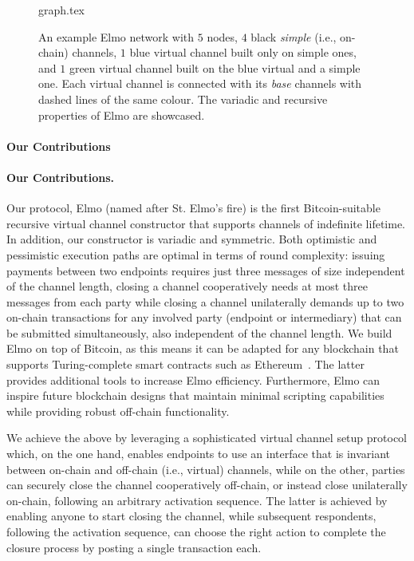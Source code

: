 \begin{figure}[!htbp]
  \centering
  {graph.tex}
  \caption{An example Elmo network with $5$ nodes, $4$ black \emph{simple}
  (i.e., on-chain) channels, $1$ blue virtual channel built only on simple ones,
  and $1$ green virtual channel built on the blue virtual and a simple one. Each
  virtual channel is connected with its \emph{base} channels with dashed lines
  of the same colour. The variadic and recursive properties of Elmo are
  showcased.}
  \label{figure:graph}
\end{figure}

\makeatletter%
%
  {\paragraph{Our Contributions}}%
  {\paragraph{Our Contributions.}}%
\makeatother%
 Our protocol, Elmo (named after St.
Elmo's fire) is the first Bitcoin-suitable
recursive virtual channel constructor that supports channels
of indefinite lifetime. In addition, our constructor is variadic and symmetric. Both optimistic and
pessimistic execution paths are optimal in terms of round complexity: issuing
payments between two endpoints requires just three messages of size
independent of the channel length, closing a channel cooperatively
needs at most three messages from each party while
closing a channel unilaterally demands up to two on-chain transactions for
any involved party (endpoint or intermediary) that can be submitted
simultaneously, also independent of the channel length. We build Elmo on top
of Bitcoin, as this means it can be adapted for any blockchain that
supports Turing-complete smart contracts such as
Ethereum~\cite{wood2014ethereum}. The latter provides additional tools to
increase Elmo efficiency. Furthermore, Elmo can inspire future
blockchain designs that maintain minimal scripting capabilities while
providing robust off-chain functionality.

We achieve the above by leveraging a sophisticated virtual channel setup
protocol which, on the one hand, enables endpoints to use an interface that is
invariant between on-chain and off-chain (i.e., virtual) channels,
while on the other, parties can securely close the channel cooperatively
off-chain, or instead close unilaterally on-chain, following an arbitrary
activation sequence. The latter is achieved by enabling anyone to
start closing the channel, while subsequent respondents, following the activation sequence, can choose the right action to complete the closure process by posting a single transaction each.

